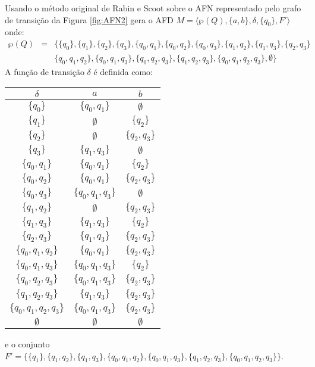 \begin{example}\label{exe:ConvertendoAFN-AFD1}
	Usando o método original de Rabin e Scoot sobre o AFN representado pelo grafo de transição da Figura \ref{fig:AFN2}  gera o AFD $M = \langle \wp(Q), \{a,b\}, \delta, \{q_0\}, F'\rangle$ onde:
	\begin{eqnarray*}
		\wp(Q) & = & \Big\{\{q_0\}, \{q_1\}, \{q_2\}, \{q_3\},    \{q_0, q_1\}, \{q_0, q_2\}, \{q_0, q_3\}, \{q_1, q_2\}, \{q_1, q_3\}, \{q_2, q_3\}\\   
		& & \{q_0, q_1, q_2\}, \{q_0, q_1, q_3\}, \{q_0, q_2, q_3\}, \{q_1, q_2, q_3\}, \{q_0, q_1, q_2, q_3\}, \emptyset \Big\} 
	\end{eqnarray*}
	A função de transição $\delta$ é definida como:
	
	\begin{table*}[h]
		\centering
		\begin{tabular}{c|cc}
			$\delta$	& $a$ & $b$\\ \hline
			$\{q_0\}$  & $\{q_0, q_1\}$ & $\emptyset$\\
			$\{q_1\}$  & $\emptyset$ & $\{q_2\}$\\
			$\{q_2\}$  & $\emptyset$ & $\{q_2, q_3\}$\\
			$\{q_3\}$  & $\{q_1, q_3\}$ & $\emptyset$\\
			$\{q_0, q_1\}$  & $\{q_0, q_1\}$ & $\{q_2\}$\\
			$\{q_0, q_2\}$  & $\{q_0, q_1\}$ & $\{q_2, q_3\}$\\
			$\{q_0, q_3\}$  & $\{q_0, q_1, q_3\}$ & $\emptyset$\\
			$\{q_1, q_2\}$  & $\emptyset$ & $\{q_2, q_3\}$\\
			$\{q_1, q_3\}$  & $\{q_1, q_3\}$ & $\{q_2\}$\\
			$\{q_2, q_3\}$  & $\{q_1, q_3\}$ & $\{q_2, q_3\}$\\
			$\{q_0, q_1, q_2\}$  & $\{q_0, q_1\}$ & $\{q_2, q_3\}$\\
			$\{q_0, q_1, q_3\}$  & $\{q_0, q_1, q_3\}$ & $\{q_2\}$\\
			$\{q_0, q_2, q_3\}$  & $\{q_0, q_1, q_3\}$ & $\{q_2, q_3\}$\\
			$\{q_1, q_2, q_3\}$  & $\{q_1, q_3\}$ & $\{q_2, q_3\}$\\
			$\{q_0, q_1, q_2, q_3\}$  & $\{q_0, q_1, q_3\}$ & $\{q_2, q_3\}$\\
			$\emptyset$  & $\emptyset$ & $\emptyset$\\ \hline
		\end{tabular}
	\end{table*}
	
	\noindent e o conjunto $F' = \{\{q_1\}, \{q_1, q_2\}, \{q_1, q_3\}, \{q_0, q_1, q_2\}, \{q_0, q_1, q_3\}, \{q_1, q_2, q_3\}, \{q_0, q_1, q_2, q_3\}\}$.
\end{example}

